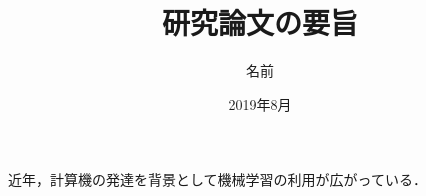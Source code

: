 \documentclass[11pt]{jsarticle}
\title{\vspace{-15mm} 研究論文の要旨 }
\author{名前}
\date{2019年8月}
\begin{document}
\maketitle
\thispagestyle{fancy}


近年，計算機の発達を背景として機械学習の利用が広がっている．



\end{document}
